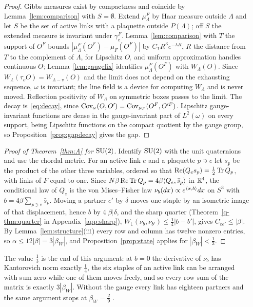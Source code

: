 \begin{proof}
Gibbs measures exist by compactness and coincide by Lemma~\ref{lem:comparison}
with $S=\emptyset$. Extend $\mu^F_\Lambda$ by Haar measure outside $\Lambda$ and
let $S$ be the set of active links with a plaquette outside $P(\Lambda)$; off $S$
the extended measure is invariant under $\gamma^F_e$. Lemma~\ref{lem:comparison}
with $T$ the support of $O^F$ bounds $|\mu^F_\Lambda(O^F)-\mu_F(O^F)|$ by
$C_TR^3e^{-\lambda R}$, $R$ the distance from $T$ to the complement of $\Lambda$,
for Lipschitz $O$, and uniform approximation handles continuous $O$;
Lemma~\ref{lem:gaugefix} identifies $\mu^F_\Lambda(O^F)$ with $W_\Lambda(O)$. Since
$W_\Lambda(\tau_vO)=W_{\Lambda-v}(O)$ and the limit does not depend on the
exhausting sequence, $\omega$ is invariant; the line field is a device for
computing $W_\Lambda$ and is never moved. Reflection positivity of $W_\Lambda$ on
symmetric boxes passes to the limit. The decay is~\eqref{eq:decay}, since
$\operatorname{Cov}_\omega(O,O')=\operatorname{Cov}_{\mu_F}(O^F,O'^F)$. Lipschitz gauge-invariant functions
are dense in the gauge-invariant part of $L^2(\omega)$ on every support, being
Lipschitz functions on the compact quotient by the gauge group, so
Proposition~\ref{prop:gapdecay} gives the gap.
\end{proof}

\begin{proof}[Proof of Theorem~\ref{thm:A} for $\mathrm{SU}(2)$]
Identify $\mathrm{SU}(2)$ with the unit quaternions and use the chordal metric. For an
active link $e$ and a plaquette $p\ni e$ let $s_p$ be the product of the other
three variables, ordered so that $\operatorname{Re}(Q_es_p)=\frac12\operatorname{Tr} Q_p$, with
links of $F$ equal to one. Since $N\beta\operatorname{Re}\operatorname{Tr} Q_p=4\beta\langle Q_e,\bar s_p\rangle$ in
$\mathbb{R}^4$, the conditional law of $Q_e$ is the von Mises--Fisher law $\nu_b(dx)
\propto e^{\langle x,b\rangle}dx$ on $S^3$ with $b=4\beta\sum_{p\ni e}\bar s_p$. Moving a
partner $e'$ by $\delta$ moves one staple by an isometric image of that
displacement, hence $b$ by $4|\beta|\delta$, and the sharp
quarter (Theorem~\ref{q-thm:quarter} in Appendix~\ref{app:sharp}), $W_1(\nu_b,\nu_{b'})\le\frac14|b-b'|$, gives
$C_{ee'}\le|\beta|$. By Lemma~\ref{lem:structure}(iii) every row and column has
twelve nonzero entries, so $\alpha\le12|\beta|=3|\beta_W|$, and
Proposition~\ref{prop:state} applies for $|\beta_W|<\frac13$.
\end{proof}

The value $\frac13$ is the end of this argument: at $b=0$ the derivative of
$\nu_b$ has Kantorovich norm exactly $\frac14$, the six staples of an active
link can be arranged with sum zero while one of them moves freely, and so
every row sum of the matrix is exactly $3|\beta_W|$. Without the gauge every
link has eighteen partners and the same argument stops at $\beta_W=\frac29$
\cite[Prop.~13]{BB26a}.

